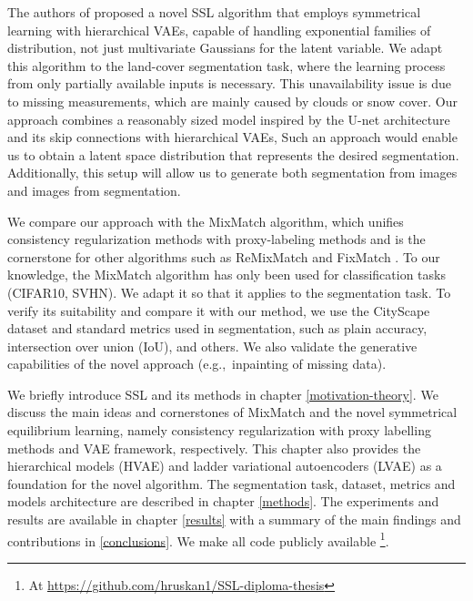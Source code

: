 The authors of \cite{sym-learning-2023} proposed a novel SSL algorithm that employs symmetrical learning with hierarchical VAEs, capable of
handling exponential families of distribution, not just multivariate Gaussians for the latent variable. We adapt this algorithm to the 
land-cover segmentation task, where the learning process from only partially available inputs is necessary. This unavailability issue is
due to missing measurements, which are mainly caused by clouds or snow cover. Our approach combines a reasonably sized model inspired by the
U-net architecture and its skip connections\cite{unet-2015} with hierarchical VAEs, Such an approach would enable us to obtain a latent space
distribution that represents the desired segmentation. Additionally, this setup will allow us to generate both segmentation from images and 
images from segmentation.

We compare our approach with the MixMatch \cite{mixmatch-2019} algorithm, which unifies consistency regularization methods with proxy-labeling
methods \cite{ssl-overview-2020} and is the cornerstone for other algorithms such as ReMixMatch \cite{remixmatch-2020} and FixMatch \cite{fixmatch-2020}.
To our knowledge, the MixMatch algorithm has only been used for classification tasks (CIFAR10, SVHN). We adapt it so that it applies
to the segmentation task. To verify its suitability and compare it with our method, we use the CityScape dataset and standard metrics used in 
segmentation, such as plain accuracy, intersection over union (IoU), and others. We also validate the generative capabilities of the novel approach 
(e.g.,~inpainting of missing data).

We briefly introduce SSL and its methods in chapter \ref{motivation-theory}. We discuss the main ideas 
and cornerstones of MixMatch and the novel symmetrical equilibrium learning, namely consistency regularization with proxy 
labelling methods and VAE framework, respectively. This chapter also provides the hierarchical models (HVAE) and ladder
variational autoencoders (LVAE) as a foundation for the novel algorithm. The segmentation task, dataset, metrics and models architecture
are described in chapter \ref{methods}. The experiments and results are available in chapter \ref{results} with a summary of the main findings and 
contributions in \ref{conclusions}. We make all code publicly available \footnote[2]{At \url{https://github.com/hruskan1/SSL-diploma-thesis}}.
